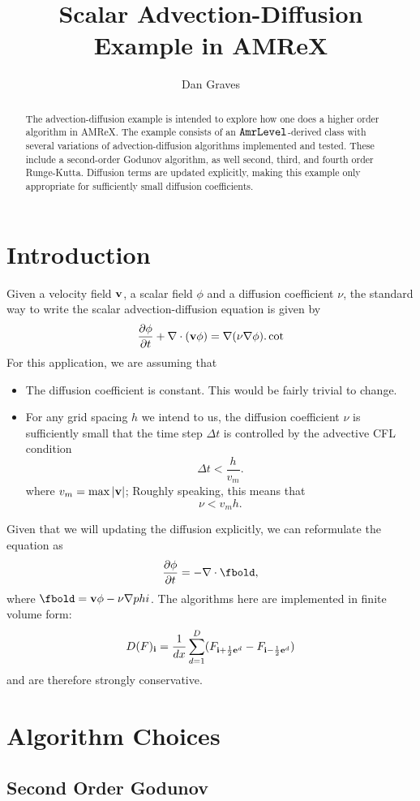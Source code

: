 \documentclass{article}
\title{Scalar Advection-Diffusion Example in AMReX}
\author{Dan Graves}
\newcommand{\ibold}{{\bf i}}
\newcommand{\ebold}{{\bf e}}
\newcommand{\vbold}{{\bf v}}
\newcommand{\dt}{{\Delta t}}
\newcommand{\dx}{{h}}
\newcommand{\half}{\frac{1}{2}}
\newcommand{\iph}{{\ibold + \half \ebold^d}}
\newcommand{\imh}{{\ibold - \half \ebold^d}}
\begin{document}
\begin{abstract}
  The advection-diffusion example is intended to explore how one does
  a higher order algorithm in AMReX.    The example consists of an
  $\tt{AmrLevel}$-derived class with several variations of
  advection-diffusion algorithms implemented and tested.  These
  include a second-order Godunov algorithm, as well second, third, and
  fourth order Runge-Kutta.   Diffusion terms are updated explicitly,
  making this example only appropriate for sufficiently small
  diffusion coefficients.
\end{abstract}

\section{Introduction}

Given a velocity field $\vbold$, a scalar field  $\phi$ and a
diffusion coefficient $\nu$, the standard way to write the 
scalar advection-diffusion equation  is given by 
$$
\frac{\partial \phi}{\partial t} + \nabla \cdot (\vbold \phi) = \nabla
(\nu \nabla \phi).
\cot 
$$
For this application, we are assuming that 
\begin{itemize}
\item The diffusion coefficient is constant.  This would be fairly
  trivial to change.
\item For any grid spacing $\dx$ we intend to us, the diffusion
  coefficient $\nu$ is sufficiently small that the time
  step $\dt$ is controlled by the advective CFL condition
$$
\dt < \frac{\dx}{v_m}.
$$
where $v_m= \max|\vbold|$;
Roughly speaking, this means that 
$$
\nu < v_m \dx.
$$
\end{itemize}
Given that we will updating the diffusion explicitly, we can
reformulate the equation as 
$$
\frac{\partial \phi}{\partial t} =  -\nabla \cdot \fbold, 
$$
where $\fbold = \vbold \phi - \nu \nabla phi$.
The algorithms here are implemented in finite volume form:
$$
D(F)_\ibold = \frac{1}{dx} \sum^D_{d = 1} (F_{\iph} - F_\imh)
$$
and are
therefore strongly conservative.

\section{Algorithm Choices}

\subsection{Second Order Godunov} 
\end{document}
